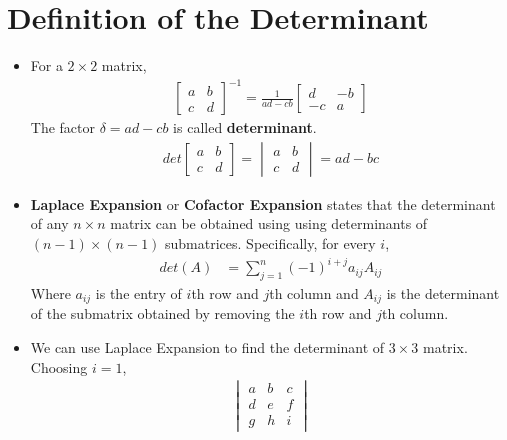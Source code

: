 
\section{Definition of the Determinant}

\begin{itemize}
  \item For a $2 \times 2$ matrix,
    \begin{align*}
      \begin{bmatrix}
        a & b\\
        c & d
      \end{bmatrix}^{-1} = \frac{1}{ad - cb}
      \begin{bmatrix}
        d & -b\\
        -c & a
      \end{bmatrix}
    \end{align*}
    The factor $\delta = ad - cb$ is called \textbf{determinant}.
    \begin{align*}
      det \begin{bmatrix}
        a & b\\
        c & d
      \end{bmatrix} = \begin{vmatrix}
        a & b\\
        c & d
      \end{vmatrix} = ad - bc
    \end{align*}
  \item \textbf{Laplace Expansion} or \textbf{Cofactor Expansion} states that the determinant of any $n \times n$ matrix can be obtained using using determinants of $(n - 1) \times (n - 1)$ submatrices.
    Specifically, for every $i$,
    \begin{align*}
      det(A) &= \sum_{j=1}^{n} (-1)^{i + j} a_{ij} A_{ij}
    \end{align*}
    \noindent Where $a_{ij}$ is the entry of $i$th row and $j$th column and $A_{ij}$ is the determinant of the submatrix obtained by removing the $i$th row and $j$th column.
  \item We can use Laplace Expansion to find the determinant of $3 \times 3$ matrix. Choosing $i = 1$,
    \begin{align*}
      \begin{vmatrix}
        a & b & c\\
        d & e & f\\
        g & h & i
      \end{vmatrix}

\end{align*}
\end{itemize}
